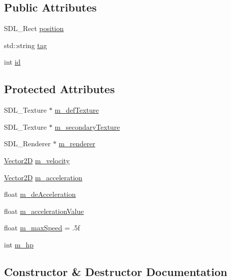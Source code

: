 \subsection*{Public Attributes}
\begin{DoxyCompactItemize}
\item 
S\+D\+L\+\_\+\+Rect \mbox{\hyperlink{class_game_object_af6009d73be98a4bd54272d06b50f2eac}{position}}
\item 
std\+::string \mbox{\hyperlink{class_game_object_a66891b8bfd67373dde0155ae7808bbb4}{tag}}
\item 
int \mbox{\hyperlink{class_game_object_a98291c60da12d9036e1ad24cfebcf6b3}{id}}
\end{DoxyCompactItemize}
\subsection*{Protected Attributes}
\begin{DoxyCompactItemize}
\item 
S\+D\+L\+\_\+\+Texture $\ast$ \mbox{\hyperlink{class_game_object_a5202d5d5df1813c567fb344617250b42}{m\+\_\+def\+Texture}}
\item 
S\+D\+L\+\_\+\+Texture $\ast$ \mbox{\hyperlink{class_game_object_aa89e916d62813d047b054c0c9cf97559}{m\+\_\+secondary\+Texture}}
\item 
S\+D\+L\+\_\+\+Renderer $\ast$ \mbox{\hyperlink{class_game_object_a2be93417ea72201ce5edc093167b2f68}{m\+\_\+renderer}}
\item 
\mbox{\hyperlink{struct_game_object_1_1_vector2_d}{Vector2D}} \mbox{\hyperlink{class_game_object_ac27549efb645f7c924d6604e318877bf}{m\+\_\+velocity}}
\item 
\mbox{\hyperlink{struct_game_object_1_1_vector2_d}{Vector2D}} \mbox{\hyperlink{class_game_object_a934563079577e8f20b597e23ae40ec20}{m\+\_\+acceleration}}
\item 
float \mbox{\hyperlink{class_game_object_a82b60a9ea631d253434ba8683ee69370}{m\+\_\+de\+Acceleration}}
\item 
float \mbox{\hyperlink{class_game_object_a6a2eccbbf7974ae9d76e58f4f5b899ac}{m\+\_\+acceleration\+Value}}
\item 
float \mbox{\hyperlink{class_game_object_a13670cbe19b2daaedbd696a3495bf598}{m\+\_\+max\+Speed}} = .\+5f
\item 
int \mbox{\hyperlink{class_game_object_a26687f9a79576969707c47f5562b7037}{m\+\_\+hp}}
\end{DoxyCompactItemize}


\subsection{Constructor \& Destructor Documentation}
\mbox{\label{class_game_object_a0b60783781874241ad26049ad968a78b}} 
